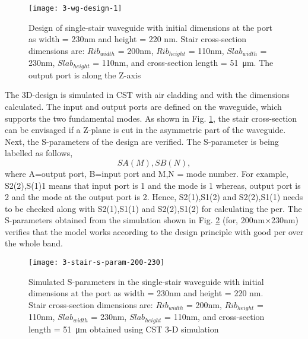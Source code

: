 \documentclass[../report.tex]{subfiles}
\begin{document}
\begin{figure}[H] %
	\centering
	\texttt{[image: 3-wg-design-1]}
	\caption{Design of single-stair waveguide with initial dimensions at the port as width = 230nm and height = 220 nm. Stair cross-section dimensions are: $Rib_{width}$ = 200nm, $Rib_{height}$ = 110nm, $Slab_{width}$ = 230nm, $Slab_{height}$ = 110nm, and cross-section length = \SI{51}{\micro\meter}. The output port is along the Z-axis}
	\label{fig:3_wg_design_1}
\end{figure}

\noindent The 3D-design is simulated in CST with air cladding and with the dimensions calculated. The input and output ports are defined on the waveguide, which supports the two fundamental modes. As shown in Fig. \ref{fig:3_wg_design_1}, the stair cross-section can be envisaged if a Z-plane is cut in the asymmetric part of the waveguide.\\

\noindent Next, the S-parameters of the design are verified. The S-parameter is being labelled as follows,
\begin{equation}\label{eq:s_parameter_label}
SA(M),SB(N),
\end{equation}
where A=output port, B=input port and M,N = mode number. For example, S2(2),S(1)1 means that input port is 1 and the mode is 1 whereas, output port is 2 and the mode at the output port is 2. Hence, S2(1),S1(2) and S2(2),S1(1) needs to be checked along with S2(1),S1(1) and S2(2),S1(2) for calculating the \gls{per}. The S-parameters obtained from the simulation shown in Fig. \ref{fig:3_stair_s_param_200_230} (for, 200nm$\times$230nm) verifies that the model works according to the design principle with good \gls{per} over the whole band. 


\begin{figure}[H] %
	\centering
	\texttt{[image: 3-stair-s-param-200-230]}
	\caption{Simulated S-parameters in the single-stair waveguide with initial dimensions at the port as width = 230nm and height = 220 nm. Stair cross-section dimensions are: $Rib_{width}$ = 200nm, $Rib_{height}$ = 110nm, $Slab_{width}$ = 230nm, $Slab_{height}$ = 110nm, and cross-section length = \SI{51}{\micro\meter} obtained using CST 3-D simulation}
	\label{fig:3_stair_s_param_200_230}
\end{figure}
\end{document}
